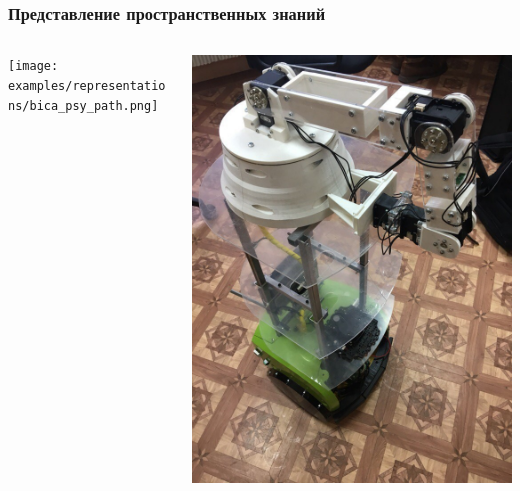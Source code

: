 	\begin{frame}
		\frametitle{Представление пространственных знаний}
		
		\begin{columns}
			\begin{column}{0.7\textwidth}
				\texttt{[image: examples/representations/bica\_psy\_path.png]}
			\end{column}
			\begin{column}{0.3\textwidth}
				\includegraphics[width=\textwidth]{nexus.jpg}
			\end{column}
		\end{columns}
		
		\nocite{*}
		\printbibliography[keyword={behplanrus}, resetnumbers=true]
	\end{frame}	

